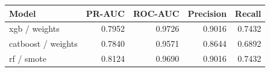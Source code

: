 \begin{tabular}{lrrrr}
\toprule Model & PR-AUC & ROC-AUC & Precision & Recall \\
\midrule
xgb / weights & 0.7952 & 0.9726 & 0.9016 & 0.7432 \\
catboost / weights & 0.7840 & 0.9571 & 0.8644 & 0.6892 \\
rf / smote & 0.8124 & 0.9690 & 0.9016 & 0.7432 \\
\bottomrule
\end{tabular}
